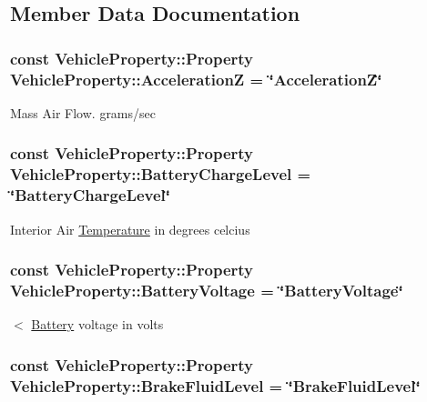 \subsection{Member Data Documentation}
\hypertarget{classVehicleProperty_a1ce0b3be3a09d5a96741890d0d67496f}{
\subsubsection[{Acceleration\+Z}]{\setlength{\rightskip}{0pt plus 5cm}const Vehicle\+Property\+::\+Property Vehicle\+Property\+::\+Acceleration\+Z = \char`\"{}Acceleration\+Z\char`\"{}\hspace{0.3cm}{\ttfamily [static]}}}\label{classVehicleProperty_a1ce0b3be3a09d5a96741890d0d67496f}
Mass Air Flow. grams/sec \hypertarget{classVehicleProperty_a71025201c20a84f3303b32b08872113a}{
\subsubsection[{Battery\+Charge\+Level}]{\setlength{\rightskip}{0pt plus 5cm}const Vehicle\+Property\+::\+Property Vehicle\+Property\+::\+Battery\+Charge\+Level = \char`\"{}Battery\+Charge\+Level\char`\"{}\hspace{0.3cm}{\ttfamily [static]}}}\label{classVehicleProperty_a71025201c20a84f3303b32b08872113a}
Interior Air \hyperlink{interfaceTemperature}{Temperature} in degrees celcius \hypertarget{classVehicleProperty_a43a70a277b955ae35a9ba795d2052591}{
\subsubsection[{Battery\+Voltage}]{\setlength{\rightskip}{0pt plus 5cm}const Vehicle\+Property\+::\+Property Vehicle\+Property\+::\+Battery\+Voltage = \char`\"{}Battery\+Voltage\char`\"{}\hspace{0.3cm}{\ttfamily [static]}}}\label{classVehicleProperty_a43a70a277b955ae35a9ba795d2052591}
$<$ \hyperlink{interfaceBattery}{Battery} voltage in volts \hypertarget{classVehicleProperty_a83bc635222e9ba14dfa134defa21e825}{
\subsubsection[{Brake\+Fluid\+Level}]{\setlength{\rightskip}{0pt plus 5cm}const Vehicle\+Property\+::\+Property Vehicle\+Property\+::\+Brake\+Fluid\+Level = \char`\"{}Brake\+Fluid\+Level\char`\"{}\hspace{0.3cm}{\ttfamily [static]}}}\label{classVehicleProperty_a83bc635222e9ba14dfa134defa21e825}

